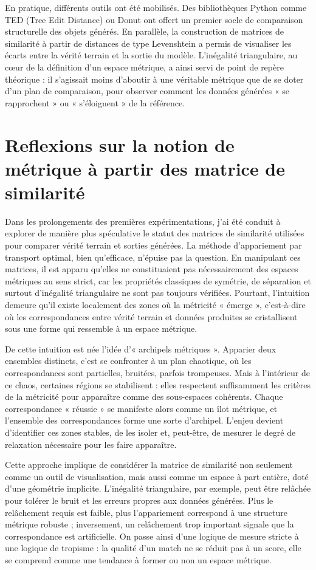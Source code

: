 En pratique, différents outils ont été mobilisés. Des bibliothèques Python comme TED (Tree Edit Distance) ou Donut ont offert un premier socle de comparaison structurelle des objets générés. En parallèle, la construction de matrices de similarité à partir de distances de type Levenshtein a permis de visualiser les écarts entre la vérité terrain et la sortie du modèle. L’inégalité triangulaire, au cœur de la définition d’un espace métrique, a ainsi servi de point de repère théorique : il s’agissait moins d’aboutir à une véritable métrique que de se doter d’un plan de comparaison, pour observer comment les données générées « se rapprochent » ou « s’éloignent » de la référence.

\section{Reflexions sur la notion de métrique à partir des matrice de similarité}

Dans les prolongements des premières expérimentations, j’ai été conduit à explorer de manière plus spéculative le statut des matrices de similarité utilisées pour comparer vérité terrain et sorties générées. La méthode d’appariement par transport optimal, bien qu’efficace, n’épuise pas la question. En manipulant ces matrices, il est apparu qu’elles ne constituaient pas nécessairement des espaces métriques au sens strict, car les propriétés classiques de symétrie, de séparation et surtout d’inégalité triangulaire ne sont pas toujours vérifiées. Pourtant, l’intuition demeure qu’il existe localement des zones où la métricité « émerge », c’est-à-dire où les correspondances entre vérité terrain et données produites se cristallisent sous une forme qui ressemble à un espace métrique.

De cette intuition est née l’idée d’« archipels métriques ». Apparier deux ensembles distincts, c’est se confronter à un plan chaotique, où les correspondances sont partielles, bruitées, parfois trompeuses. Mais à l’intérieur de ce chaos, certaines régions se stabilisent : elles respectent suffisamment les critères de la métricité pour apparaître comme des sous-espaces cohérents. Chaque correspondance « réussie » se manifeste alors comme un îlot métrique, et l’ensemble des correspondances forme une sorte d’archipel. L’enjeu devient d’identifier ces zones stables, de les isoler et, peut-être, de mesurer le degré de relaxation nécessaire pour les faire apparaître.

Cette approche implique de considérer la matrice de similarité non seulement comme un outil de visualisation, mais aussi comme un espace à part entière, doté d’une géométrie implicite. L’inégalité triangulaire, par exemple, peut être relâchée pour tolérer le bruit et les erreurs propres aux données générées. Plus le relâchement requis est faible, plus l’appariement correspond à une structure métrique robuste ; inversement, un relâchement trop important signale que la correspondance est artificielle. On passe ainsi d’une logique de mesure stricte à une logique de tropisme : la qualité d’un match ne se réduit pas à un score, elle se comprend comme une tendance à former ou non un espace métrique.

